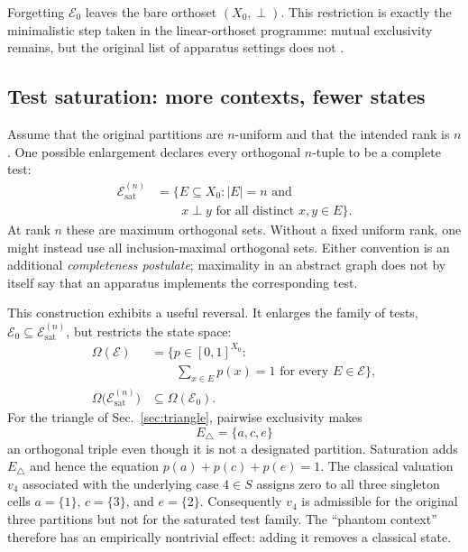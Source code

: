 \documentclass[
  aps,
  pra,
  twocolumn,
  amsmath,
  amssymb,
  longbibliography,
  nofootinbib,
  floatfix
]{revtex4-2}
\newcommand{\cE}{\mathcal E}
\begin{document}
Forgetting $\cE_0$ leaves the bare orthoset $(X_0,\perp)$.  This restriction is
exactly the minimalistic step taken in the linear-orthoset programme: mutual
exclusivity remains, but the original list of apparatus settings does not
\cite{EmirKrumlPasekaVetterlein2021,PasekaVetterlein2023Linear}.

\subsection{Test saturation: more contexts, fewer states}

Assume that the original partitions are $n$-uniform and that the intended rank
is $n$.  One possible enlargement declares every orthogonal $n$-tuple to be a
complete test:
\begin{equation}
\begin{aligned}
  \cE_{\mathrm{sat}}^{(n)}
  &=\big\{E\subseteq X_0:|E|=n\text{ and}\\
  &\qquad x\perp y\text{ for all distinct }x,y\in E\big\}.
\end{aligned}
  \label{eq:test-saturation}
\end{equation}
At rank $n$ these are maximum orthogonal sets.  Without a fixed uniform rank,
one might instead use all inclusion-maximal orthogonal sets.  Either convention
is an additional \emph{completeness postulate}; maximality in an abstract graph
does not by itself say that an apparatus implements the corresponding test.

This construction exhibits a useful reversal.  It enlarges the family of
tests, $\cE_0\subseteq\cE_{\mathrm{sat}}^{(n)}$, but restricts the state space:
\begin{equation}
\begin{aligned}
  \Omega(\cE)&=
    \bigg\{p\in[0,1]^{X_0}:\\[-0.4ex]
       &\qquad\sum_{x\in E}p(x)=1
       \text{ for every }E\in\cE\bigg\},\\
  \Omega\big(\cE_{\mathrm{sat}}^{(n)}\big)&\subseteq\Omega(\cE_0).
\end{aligned}
  \label{eq:state-restriction}
\end{equation}
For the triangle of Sec.~\ref{sec:triangle}, pairwise exclusivity makes
\begin{equation}
  E_\triangle=\{a,c,e\}
  \label{eq:phantom-test}
\end{equation}
an orthogonal triple even though it is not a designated partition.  Saturation
adds $E_\triangle$ and hence the equation
$p(a)+p(c)+p(e)=1$.  The classical valuation $v_4$ associated with the
underlying case $4\in S$ assigns zero to all three singleton cells
$a=\{1\}$, $c=\{3\}$, and $e=\{2\}$.  Consequently $v_4$ is admissible for
the original three partitions but not for the saturated test family.  The
``phantom context'' therefore has an empirically nontrivial effect: adding it
removes a classical state.
\end{document}
